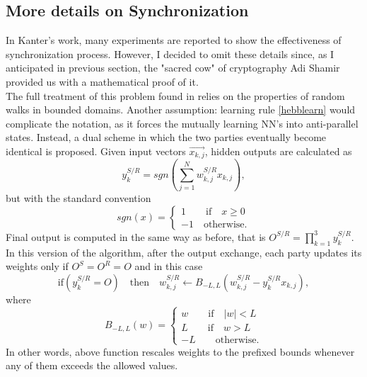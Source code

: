 \documentclass[%
    corpo=11pt,
    twoside,
    stile=classica,
    oldstyle,
    autoretitolo,
    tipotesi=magistrale,
    greek,
    evenboxes,
    english
]{toptesi}
\begin{document}
\subsection{More details on Synchronization}
\label{ssc:synchro}
In Kanter's work, many experiments are reported to show the effectiveness of synchronization process. However, I decided to omit these details since, as I anticipated in previous section, the "sacred cow" of cryptography Adi Shamir provided us with a mathematical proof of it. \\
The full treatment of this problem found in \cite{shamir} relies on the properties of random walks in bounded domains. Another assumption: learning rule \ref{hebblearn} would complicate the notation, as it forces the mutually learning NN's into anti-parallel states. Instead, a dual scheme in which the two parties eventually become identical is proposed. Given input vectors $\vec{x_{k,j}}$, hidden outputs are calculated as
\begin{equation}
y_k^{S/R} = sgn\left(\sum_{j=1}^{N}w_{k,j}^{S/R}x_{k,j}\right),
\end{equation}
but with the standard convention 
\begin{equation}
sgn(x) = \begin{cases}
1 \qquad \text{if} \quad x \geq 0 \\
-1 \quad \text{otherwise.}
\end{cases}
\end{equation}
Final output is computed in the same way as before, that is $O^{S/R} = \prod_{k=1}^{3}y_k^{S/R}$. In this version of the algorithm, after the output exchange, each party updates its weights only if $O^S=O^R=O$ and in this case 
\begin{equation}
\label{shamirlearn}
\text{if} \left(y_k^{S/R}=O\right) \quad \text{then} \quad 
w_{k,j}^{S/R} \leftarrow B_{-L,L}\left(w_{k,j}^{S/R} - y_k^{S/R}x_{k,j}\right),
\end{equation}
where
\begin{equation}
\label{rebound}
B_{-L,L}(w) = \begin{cases}
w \qquad \text{if} \quad |w|<L \\
L \qquad \text{if} \quad w>L \\
-L \qquad \text{otherwise}.
\end{cases}
\end{equation}
In other words, above function rescales weights to the prefixed bounds whenever any of them exceeds the allowed values. \\
\end{document}
